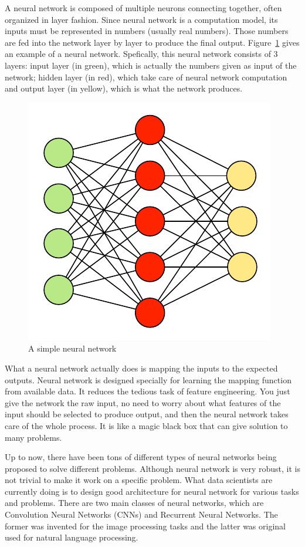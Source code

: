\documentclass[12pt, sort&compress]{report}
\begin{document}
\par A neural network is composed of multiple neurons connecting together, often organized in layer fashion. Since neural network is a computation model, its inputs must be represented in numbers (usually real numbers). Those numbers are fed into the network layer by layer to produce the final output. Figure~\ref{fig:2:03} gives an example of a neural network. Spefically, this neural network consists of 3 layers: input layer (in green), which is actually the numbers given as input of the network; hidden layer (in red), which take care of neural network computation and output layer (in yellow), which is what the network produces.
\begin{figure}[!htbp]
	\centering
	\includegraphics[scale=1.]{images/PDF/neural-net/neural-net.pdf}
	\caption{A simple neural network}
	\label{fig:2:03}
\end{figure}
\par What a neural network actually does is mapping the inputs to the expected outputs. Neural network is designed specially for learning the mapping function from available data. It reduces the tedious task of feature engineering. You just give the network the raw input, no need to worry about what features of the input should be selected to produce output, and then the neural network takes care of the whole process. It is like a magic black box that can give solution to many problems.
\par Up to now, there have been tons of different types of neural networks being proposed to solve different problems. Although neural network is very robust, it is not trivial to make it work on a specific problem. What data scientists are currently doing is to design good architecture for neural network for various tasks and problems. There are two main classes of neural networks, which are Convolution Neural Networks (CNNs) and Recurrent Neural Networks. The former was invented for the image processing tasks and the latter was original used for natural language processing.
\end{document}
